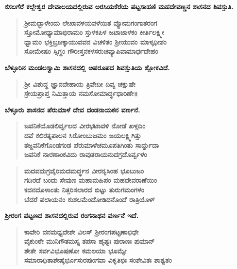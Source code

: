 \noindent
\textbf{ಕಸಲಗೆರೆ ಕಲ್ಲೇಶ್ವರ ದೇವಾಲಯದಲ್ಲಿರುವ ಅರಸಿಯಕೆರೆಯ ಪಟ್ಟಸಾಹಣಿ ಮಹದೇವಣ್ಣನ ಶಾಸನದ ಶಿವಸ್ತುತಿ.}

\begin{verse}
\textbf{ಶ‍್ರೀಮದ್ಭಾಳೇಂದು ಲೇಖಾವಳಯವಳೆಯಿತ ವ್ಯೋಮಗಂಗಾತರಂಗ \\ ಸ್ತೋಮೋಧ್ಯಾಮಾಭಿರಾಮಂ ಸ್ತುಳಕಪಿಳ ಜಟಾಜಾಳಕಂ ಕೀರ್ತಿಲಕ್ಷ್ಮೀ \\ ಧ್ವಾಮಂ ಭಕ್ತಿಬ್ರಜಕ್ಕಾಯುವವನ ವಿಚಳಿತಂ ಶ‍್ರೀಯುವಂ ಮಾಳ್ಕಧೀಶಂ\\ ಸೋಮೇಷಂ ಸ್ನಿಗ್ಧಂ ಗೌರೀಸ್ತನಕಳಸರುಚಿವ್ಯಾಪಿವಾಮಾರ್ಧದೇಹಂ}
\end{verse}

\newpage

\noindent
\textbf{ಬೆಳ್ಳೂರಿನ ಮಂಡಲಸ್ವಾಮಿ ಶಾಸನದಲ್ಲಿ ಅಪರೂಪದ ಶಿವಸ್ತುತಿಯ ಶ್ಲೋಕವಿದೆ.}

\begin{verse}
\textbf{ಶ‍್ರೀ ವಿಶುದ್ಧ ಜ್ಞಾನದೇಹಾಯ ತ್ರಿವೇದೀ ದಿವ್ಯ ಚಕ್ಷುಷೇ\\ ಸ್ರೇಯಪ್ರಾಪ್ತ ನಿಮಿತ್ತಾಯ ನಮಸೋಮಾರ್ದ್ಧಧಾರಿಣೇ॥}
\end{verse}

\noindent
\textbf{ಬೆಳ್ಳೂರು ಶಾಸನದ ಪೆರುಮಾಳೆ ದೇವ ದಂಡನಾಯಕನ ವರ್ಣನೆ.}

\begin{verse}
\textbf{ಜವನಿಕೆಯೊಡಲಿರ್ವ್ವಲದ ವೀರಭಟಾವಳಿ ನೋಡೆ ಖಳ್ಗದಿಂ\\ ದವೆ ಕಲಿರತ್ನಪಾಲನ ಸಿರೋಂಬುಜಮಂ ಜಯಲಕ್ಷ್ಮಿಗಿತ್ತು \\ ತಜ್ಜವನಿಕೆಗೊಂಡಗಂಡ ಪೆರುಮಾಳೆಚಮೂಪತಿಗಿಂತು ಸಾರ್ದ್ದುದಾ \\ ಜವನಿಕೆ ನಾರಣಾಂಕವಿದು ರಾವುತರಾಯನುದಗ್ರದೊರ್ವ್ವಳಂ}
\end{verse}

\begin{verse}
\textbf{ಮದವದುಗ್ರವೈರಿಮದಮರ್ದ್ಧನ ವೀರನೃಸಿಂಹ ಭೂಬುಜಂ \\ ಗದಿರದೆ ಬಂದು ಸೇವುಣ ಮಹಾಮಹಿಪಂ ಮಹದೇವರಾಣೆಯಿಂ \\ ಕದನದೊಳಾಂತು ನಿತ್ತರಿಸಲಾರದೆ ಬಿಟ್ಟು ತುರುಗಮಂಗಳಂ \\ ಬೆದರೆ ಪಲಾಯನಂ ಕುಶಲಮೆಂದೋಡಿದನೊಂದೆ ರಾತ್ರಿಯೊಳ್​}
\end{verse}

\noindent
\textbf{ಶ‍್ರೀರಂಗ ಪಟ್ಟಣದ ಶಾಸನದಲ್ಲಿರುವ ರಂಗನಾಥನ ವರ್ಣನೆ ಇದೆ.}

\begin{verse}
\textbf{ಕಾವೇರಿ ವನಮಧ್ಯದೇಶೇ ವಿಲಸ್​ ಶ‍್ರೀರಂಗಪಟ್ಟಣಾಭಿಧೇ \\ ವೈಕುಂಠೇ ಮುನಿಗೌತಮಸ್ಯ ತಪಸಾ ಹೃಷ್ಟಃ ಪುರಾಣಃ ಪುಮಾನ್​ \\ ಶೇತೇ ಸರ್ವವಿಭೂಷಣೋ ಕಮಲಯಾ ಭೂಮ್ಯೇ \\ ಸಮಾರಾಧಿತಾಶೇಷೈರ್ಭೂಸುರಪುಂಗವಾ ವಿಕೃತಿಭಿಃ ಸಂಶೇವಿತಃ ಶಾಶ್ವತಂ}
\end{verse}

